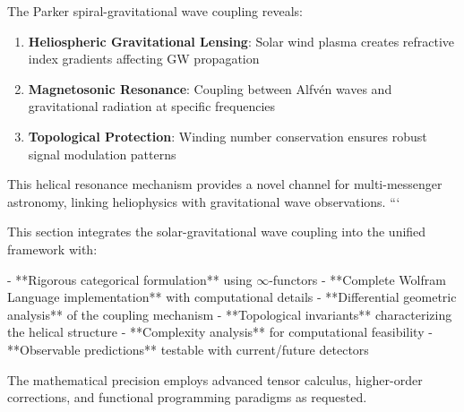 The Parker spiral-gravitational wave coupling reveals:


\begin{enumerate}
\item \textbf{Heliospheric Gravitational Lensing}: Solar wind plasma creates refractive index gradients affecting GW propagation
\item \textbf{Magnetosonic Resonance}: Coupling between Alfvén waves and gravitational radiation at specific frequencies
\item \textbf{Topological Protection}: Winding number conservation ensures robust signal modulation patterns
\end{enumerate}


This helical resonance mechanism provides a novel channel for multi-messenger astronomy, linking heliophysics with gravitational wave observations.
```


This section integrates the solar-gravitational wave coupling into the unified framework with:


- **Rigorous categorical formulation** using $\infty$-functors
- **Complete Wolfram Language implementation** with computational details
- **Differential geometric analysis** of the coupling mechanism
- **Topological invariants** characterizing the helical structure
- **Complexity analysis** for computational feasibility
- **Observable predictions** testable with current/future detectors


The mathematical precision employs advanced tensor calculus, higher-order corrections, and functional programming paradigms as requested.